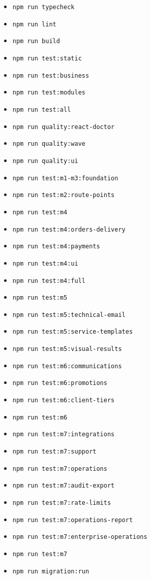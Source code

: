 \begin{itemize}
    \item \texttt{npm run typecheck}
    \item \texttt{npm run lint}
    \item \texttt{npm run build}
    \item \texttt{npm run test:static}
    \item \texttt{npm run test:business}
    \item \texttt{npm run test:modules}
    \item \texttt{npm run test:all}
    \item \texttt{npm run quality:react-doctor}
    \item \texttt{npm run quality:wave}
    \item \texttt{npm run quality:ui}
    \item \texttt{npm run test:m1-m3:foundation}
    \item \texttt{npm run test:m2:route-points}
    \item \texttt{npm run test:m4}
    \item \texttt{npm run test:m4:orders-delivery}
    \item \texttt{npm run test:m4:payments}
    \item \texttt{npm run test:m4:ui}
    \item \texttt{npm run test:m4:full}
    \item \texttt{npm run test:m5}
    \item \texttt{npm run test:m5:technical-email}
    \item \texttt{npm run test:m5:service-templates}
    \item \texttt{npm run test:m5:visual-results}
    \item \texttt{npm run test:m6:communications}
    \item \texttt{npm run test:m6:promotions}
    \item \texttt{npm run test:m6:client-tiers}
    \item \texttt{npm run test:m6}
    \item \texttt{npm run test:m7:integrations}
    \item \texttt{npm run test:m7:support}
    \item \texttt{npm run test:m7:operations}
    \item \texttt{npm run test:m7:audit-export}
    \item \texttt{npm run test:m7:rate-limits}
    \item \texttt{npm run test:m7:operations-report}
    \item \texttt{npm run test:m7:enterprise-operations}
    \item \texttt{npm run test:m7}
    \item \texttt{npm run migration:run}
\end{itemize}

